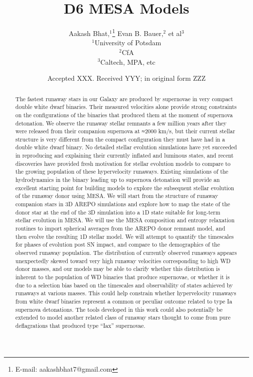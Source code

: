 \documentclass[fleqn,usenatbib]{mnras}
\title[D6 MESA Models 2]{D6 MESA Models}
\author[Bhat et al.]{
Aakash Bhat,$^{1}$\thanks{E-mail: aakashbhat7@gmail.com}
Evan B. Bauer,$^{2}$
et al$^{3}$
\\
$^{1}$University of Potsdam\\
$^{2}$CfA\\
$^{3}$Caltech, MPA, etc
}
\date{Accepted XXX. Received YYY; in original form ZZZ}
\begin{document}
\label{firstpage}
\pagerange{\pageref{firstpage}--\pageref{lastpage}}
\maketitle

\begin{abstract}
The fastest runaway stars in our Galaxy are produced by supernovae in very compact double white dwarf binaries. Their measured velocities alone provide strong constraints on the configurations of the binaries that produced them at the moment of supernova detonation. We observe the runaway stellar remnants a few million years after they were released from their companion supernova at ≈2000 km/s, but their current stellar structure is very different from the compact configuration they must have had in a double white dwarf binary. No detailed stellar evolution simulations have yet succeeded in reproducing and explaining their currently inflated and luminous states, and recent discoveries have provided fresh motivation for stellar evolution models to compare to the growing population of these hypervelocity runaways. Existing simulations of the hydrodynamics in the binary leading up to supernova detonation will provide an excellent starting point for building models to explore the subsequent stellar evolution of the runaway donor using MESA.
We will start from the structure of runaway companion stars in 3D AREPO simulations and explore how to map the state of the donor star at the end of the 3D simulation into a 1D state suitable for long-term stellar evolution in MESA. We will use the MESA composition and entropy relaxation routines to import spherical averages from the AREPO donor remnant model, and then evolve the resulting 1D stellar model. We will attempt to quantify the timescales for phases of evolution post SN impact, and compare to the demographics of the observed runaway population. The distribution of currently observed runaways appears unexpectedly skewed toward very high runaway velocities corresponding to high WD donor masses, and our models may be able to clarify whether this distribution is inherent to the population of WD binaries that produce supernovae, or whether it is due to a selection bias based on the timescales and observability of states achieved by runaways at various masses. This could help constrain whether hypervelocity runaways from white dwarf binaries represent a common or peculiar outcome related to type Ia supernova detonations. The tools developed in this work could also potentially be extended to model another related class of runaway stars thought to come from pure deflagrations that produced type “Iax” supernovae.


\end{abstract}
\end{document}
